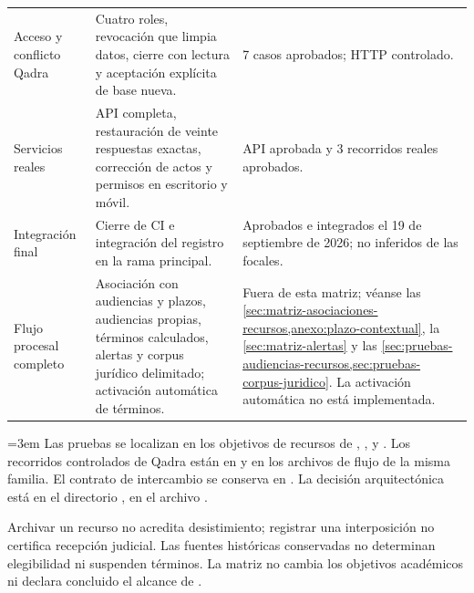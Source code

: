 \begin{longtable}{@{}L{3.2cm} L{7.6cm} L{4.6cm}@{}}
  \addlinespace
  Acceso y conflicto Qadra & Cuatro roles, revocación que limpia datos, cierre con lectura y aceptación explícita de base nueva. & 7 casos aprobados; HTTP controlado. \\
  \addlinespace
  Servicios reales & API completa, restauración de veinte respuestas exactas, corrección de actos y permisos en escritorio y móvil. & API aprobada y 3 recorridos reales aprobados. \\
  \addlinespace
  Integración final & Cierre de CI e integración del registro en la rama principal. & Aprobados e integrados el 19 de septiembre de 2026; no inferidos de las focales. \\
  \addlinespace
  Flujo procesal completo & Asociación con audiencias y plazos, audiencias propias, términos calculados, alertas y corpus jurídico delimitado; activación automática de términos. & Fuera de esta matriz; véanse las \cref{sec:matriz-asociaciones-recursos,anexo:plazo-contextual}, la \cref{sec:matriz-alertas} y las \cref{sec:pruebas-audiencias-recursos,sec:pruebas-corpus-juridico}. La activación automática no está implementada. \\
\end{longtable}

{\emergencystretch=3em Las pruebas se localizan en los objetivos de recursos de , ,  y . Los recorridos controlados de Qadra están en  y en los archivos de flujo de la misma familia. El contrato de intercambio se conserva en . La decisión arquitectónica está en el directorio , en el archivo .\par}

Archivar un recurso no acredita desistimiento; registrar una interposición no certifica recepción judicial. Las fuentes históricas conservadas no determinan elegibilidad ni suspenden términos. La matriz no cambia los objetivos académicos ni declara concluido el alcance de .
